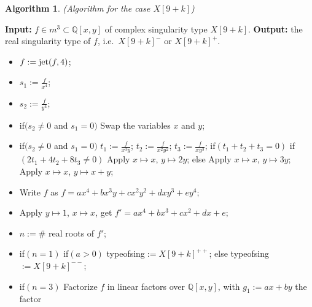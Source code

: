 \documentclass{amsproc}
\begin{document}
\newtheorem{X[9+k]}[kjet]{Algorithm}
\begin{X[9+k]}(Algorithm for the case $X[9+k]$)
\end{X[9+k]}
\noindent\textnormal{\bf Input:} $f\in m^3\subset\mathbb Q[x,y]$ of complex singularity type $X[9+k]$.\newline
\textnormal{\bf Output:} the real singularity type of $f$, i.e.~$X[9+k]^-$ or $X[9+k]^+$.
\begin{itemize}
\item $f:=\textnormal{jet}(f,4)$;
\item $s_1:=\frac{f}{x^4}$;
\item $s_2:=\frac{f}{y^4}$;
\item if$(s_2\neq0$ and $s_1=0)$\newline
\phantom{}\quad Swap the variables $x$ and $y$;\newline
\item if$(s_2\neq0$ and $s_1=0)$\newline
\phantom{}\quad $t_1:=\frac{f}{x^3y}$;\newline
\phantom{}\quad $t_2:=\frac{f}{x^2y^2}$;\newline
\phantom{}\quad $t_3:=\frac{f}{xy^3}$;\newline
\phantom{}\quad if$(t_1+t_2+t_3=0)$\newline
\phantom{}\quad\quad if$(2t_1+4t_2+8t_3\neq0)$\newline
\phantom{}\quad\quad\quad Apply $x\mapsto x$, $y\mapsto 2y$;\newline
\phantom{}\quad\quad else\newline
\phantom{}\quad\quad\quad Apply $x\mapsto x$, $y\mapsto 3y$;\newline
\phantom{}\quad Apply $x\mapsto x$, $y\mapsto x+y$;
\item Write $f$ as $f=ax^4+bx^3y+cx^2y^2+dxy^3+ey^4$;
\item Apply $y\mapsto 1$, $x\mapsto x$, get $f'=ax^4+bx^3+cx^2+dx+e;$
\item $n:=\#$ real roots of $f'$; 
\item if$(n=1)$\newline
\phantom{}\quad if$(a>0)$\newline
\phantom{}\quad\quad typeofsing$:=X[9+k]^{++}$;\newline
\phantom{}\quad else\newline
\phantom{}\quad\quad typeofsing$:=X[9+k]^{--}$;
\item if$(n=3)$\newline
\phantom{}\quad Factorize $f$ in linear factors over $\mathbb Q[x,y]$, with $g_1:=ax+by$ the factor\newline

\end{itemize}
\end{document}
